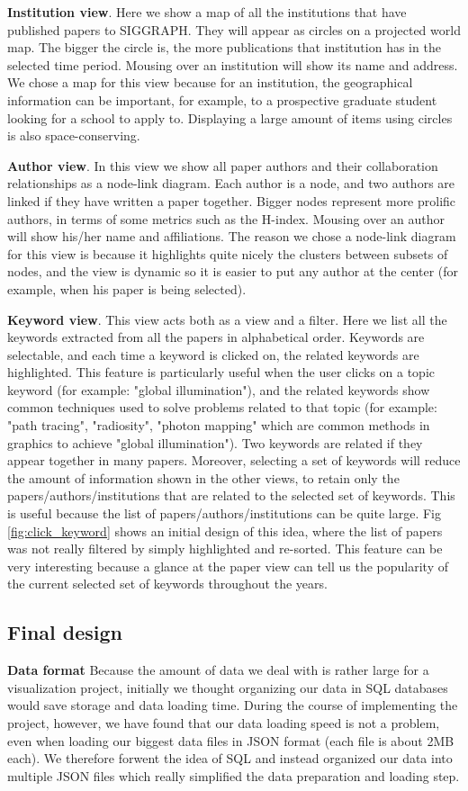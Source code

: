 \textbf{Institution view}. Here we show a map of all the institutions that have published papers to SIGGRAPH. They will appear as circles on a projected world map. The bigger the circle is, the more publications that institution has in the selected time period. Mousing over an institution will show its name and address. We chose a map for this view because for an institution, the geographical information can be important, for example, to a prospective graduate student looking for a school to apply to. Displaying a large amount of items using circles is also space-conserving.

\textbf{Author view}. In this view we show all paper authors and their collaboration relationships as a node-link diagram. Each author is a node, and two authors are linked if they have written a paper together. Bigger nodes represent more prolific authors, in terms of some metrics such as the H-index. Mousing over an author will show his/her name and affiliations. The reason we chose a node-link diagram for this view is because it highlights quite nicely the clusters between subsets of nodes, and the view is dynamic so it is easier to put any author at the center (for example, when his paper is being selected).

\textbf{Keyword view}. This view acts both as a view and a filter. Here we list all the keywords extracted from all the papers in alphabetical order. Keywords are selectable, and each time a keyword is clicked on, the related keywords are highlighted. This feature is particularly useful when the user clicks on a topic keyword (for example: "global illumination"), and the related keywords show common techniques used to solve problems related to that topic (for example: "path tracing", "radiosity", "photon mapping" which are common methods in graphics to achieve "global illumination"). Two keywords are related if they appear together in many papers. Moreover, selecting a set of keywords will reduce the amount of information shown in the other views, to retain only the papers/authors/institutions that are related to the selected set of keywords. This is useful because the list of papers/authors/institutions can be quite large. Fig \ref{fig:click_keyword} shows an initial design of this idea, where the list of papers was not really filtered by simply highlighted and re-sorted. This feature can be very interesting because a glance at the paper view can tell us the popularity of the current selected set of keywords throughout the years.

\subsection{Final design}
\textbf{Data format}
Because the amount of data we deal with is rather large for a visualization project, initially we thought organizing our data in SQL databases would save storage and data loading time. During the course of implementing the project, however, we have found that our data loading speed is not a problem, even when loading our biggest data files in JSON format (each file is about 2MB each). We therefore forwent the idea of SQL and instead organized our data into multiple JSON files which really simplified the data preparation and loading step.

